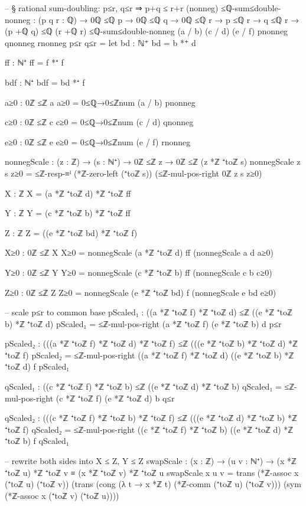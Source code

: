 \documentclass[11pt,a4paper]{book}
\begin{document}
\begin{code}
-- § rational sum-doubling: p≤r, q≤r ⇒ p+q ≤ r+r (nonneg)
≤ℚ-sum≤double-nonneg : (p q r : ℚ) → 0ℚ ≤ℚ p → 0ℚ ≤ℚ q → 0ℚ ≤ℚ r → p ≤ℚ r → q ≤ℚ r → (p +ℚ q) ≤ℚ (r +ℚ r)
≤ℚ-sum≤double-nonneg (a / b) (c / d) (e / f) pnonneg qnonneg rnonneg p≤r q≤r =
  let
    bd : ℕ⁺
    bd = b *⁺ d

    ff : ℕ⁺
    ff = f *⁺ f

    bdf : ℕ⁺
    bdf = bd *⁺ f

    a≥0 : 0ℤ ≤ℤ a
    a≥0 = 0≤ℚ→0≤ℤnum (a / b) pnonneg

    c≥0 : 0ℤ ≤ℤ c
    c≥0 = 0≤ℚ→0≤ℤnum (c / d) qnonneg

    e≥0 : 0ℤ ≤ℤ e
    e≥0 = 0≤ℚ→0≤ℤnum (e / f) rnonneg

    nonnegScale : (z : ℤ) → (s : ℕ⁺) → 0ℤ ≤ℤ z → 0ℤ ≤ℤ (z *ℤ ⁺toℤ s)
    nonnegScale z s z≥0 =
      ≤ℤ-resp-≡ˡ (*ℤ-zero-left (⁺toℤ s))
        (≤ℤ-mul-pos-right 0ℤ z s z≥0)

    X : ℤ
    X = (a *ℤ ⁺toℤ d) *ℤ ⁺toℤ ff

    Y : ℤ
    Y = (c *ℤ ⁺toℤ b) *ℤ ⁺toℤ ff

    Z : ℤ
    Z = ((e *ℤ ⁺toℤ bd) *ℤ ⁺toℤ f)

    X≥0 : 0ℤ ≤ℤ X
    X≥0 = nonnegScale (a *ℤ ⁺toℤ d) ff (nonnegScale a d a≥0)

    Y≥0 : 0ℤ ≤ℤ Y
    Y≥0 = nonnegScale (c *ℤ ⁺toℤ b) ff (nonnegScale c b c≥0)

    Z≥0 : 0ℤ ≤ℤ Z
    Z≥0 = nonnegScale (e *ℤ ⁺toℤ bd) f (nonnegScale e bd e≥0)

    -- scale p≤r to common base
    pScaled₁ : ((a *ℤ ⁺toℤ f) *ℤ ⁺toℤ d) ≤ℤ ((e *ℤ ⁺toℤ b) *ℤ ⁺toℤ d)
    pScaled₁ = ≤ℤ-mul-pos-right (a *ℤ ⁺toℤ f) (e *ℤ ⁺toℤ b) d p≤r

    pScaled₂ : (((a *ℤ ⁺toℤ f) *ℤ ⁺toℤ d) *ℤ ⁺toℤ f) ≤ℤ (((e *ℤ ⁺toℤ b) *ℤ ⁺toℤ d) *ℤ ⁺toℤ f)
    pScaled₂ = ≤ℤ-mul-pos-right ((a *ℤ ⁺toℤ f) *ℤ ⁺toℤ d) ((e *ℤ ⁺toℤ b) *ℤ ⁺toℤ d) f pScaled₁

    qScaled₁ : ((c *ℤ ⁺toℤ f) *ℤ ⁺toℤ b) ≤ℤ ((e *ℤ ⁺toℤ d) *ℤ ⁺toℤ b)
    qScaled₁ = ≤ℤ-mul-pos-right (c *ℤ ⁺toℤ f) (e *ℤ ⁺toℤ d) b q≤r

    qScaled₂ : (((c *ℤ ⁺toℤ f) *ℤ ⁺toℤ b) *ℤ ⁺toℤ f) ≤ℤ (((e *ℤ ⁺toℤ d) *ℤ ⁺toℤ b) *ℤ ⁺toℤ f)
    qScaled₂ = ≤ℤ-mul-pos-right ((c *ℤ ⁺toℤ f) *ℤ ⁺toℤ b) ((e *ℤ ⁺toℤ d) *ℤ ⁺toℤ b) f qScaled₁

    -- rewrite both sides into X ≤ Z, Y ≤ Z
    swapScale : (x : ℤ) → (u v : ℕ⁺) → (x *ℤ ⁺toℤ u) *ℤ ⁺toℤ v ≡ (x *ℤ ⁺toℤ v) *ℤ ⁺toℤ u
    swapScale x u v =
      trans
        (*ℤ-assoc x (⁺toℤ u) (⁺toℤ v))
        (trans
          (cong (λ t → x *ℤ t) (*ℤ-comm (⁺toℤ u) (⁺toℤ v)))
          (sym (*ℤ-assoc x (⁺toℤ v) (⁺toℤ u))))


\end{code}
\end{document}
